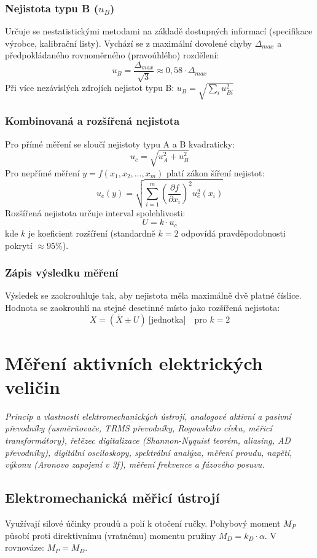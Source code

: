 \subsection{Nejistota typu B (\texorpdfstring{$u_B$}{u_B})}
Určuje se nestatistickými metodami na základě dostupných informací (specifikace výrobce, kalibrační listy). Vychází se z maximální dovolené chyby $\Delta_{max}$ a předpokládaného rovnoměrného (pravoúhlého) rozdělení:
\[ u_B = \frac{\Delta_{max}}{\sqrt{3}} \approx 0{,}58 \cdot \Delta_{max} \]
Při více nezávislých zdrojích nejistot typu B: $u_B = \sqrt{\sum_{i} u_{Bi}^2}$

\subsection{Kombinovaná a rozšířená nejistota}
Pro přímé měření se sloučí nejistoty typu A a B kvadraticky:
\[ u_c = \sqrt{u_A^2 + u_B^2} \]
Pro nepřímé měření $y = f(x_1, x_2, \dots, x_m)$ platí zákon šíření nejistot:
\[ u_c(y) = \sqrt{\sum_{i=1}^m \left(\frac{\partial f}{\partial x_i}\right)^2 u_c^2(x_i)} \]
Rozšířená nejistota určuje interval spolehlivosti:
\[ U = k \cdot u_c \]
kde $k$ je koeficient rozšíření (standardně $k=2$ odpovídá pravděpodobnosti pokrytí $\approx 95\%$).

\subsection{Zápis výsledku měření}
Výsledek se zaokrouhluje tak, aby nejistota měla maximálně dvě platné číslice. Hodnota se zaokrouhlí na stejné desetinné místo jako rozšířená nejistota:
\[ X = (\bar{X} \pm U)\ \text{[jednotka]} \quad \text{pro } k=2 \]


\chapter{Měření aktivních elektrických veličin}
\label{ch:aktivni_veliciny}

\noindent\textit{Princip a vlastnosti elektromechanických ústrojí, analogové aktivní a pasivní převodníky (usměrňovače, TRMS převodníky, Rogowskiho cívka, měřicí transformátory), řetězec digitalizace (Shannon-Nyquist teorém, aliasing, AD převodníky), digitální osciloskopy, spektrální analýza, měření proudu, napětí, výkonu (Aronovo zapojení v 3f), měření frekvence a fázového posuvu.}

\section{Elektromechanická měřicí ústrojí}
Využívají silové účinky proudů a polí k otočení ručky. Pohybový moment $M_P$ působí proti direktivnímu (vratnému) momentu pružiny $M_D = k_D \cdot \alpha$. V rovnováze: $M_P = M_D$.

